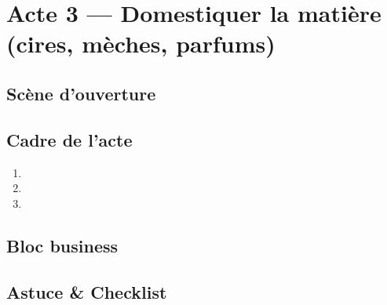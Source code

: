 \documentclass[../../main.tex]{subfiles}
\begin{document}
\chapter{Acte 3 — Domestiquer la matière (cires, mèches, parfums)}

\begin{Hook}
\end{Hook}

\section*{Scène d'ouverture}

\section{Cadre de l'acte}
\begin{BlocObjectif}
\end{BlocObjectif}

\spacer

\begin{BlocMateriel}
\end{BlocMateriel}

\spacer

\begin{BlocEtapes}
\begin{enumerate}
  \item 
  \item 
  \item 
\end{enumerate}
\end{BlocEtapes}

\spacer

\begin{BlocControles}
\end{BlocControles}

\spacer

\begin{BlocDepannage}
\end{BlocDepannage}

\section{Bloc business}
\begin{BlocCouts}
\end{BlocCouts}

\spacer

\begin{BlocAVendre}
\end{BlocAVendre}

\section*{Astuce \& Checklist}
\begin{BlocAstuce}
\end{BlocAstuce}

\spacer

\begin{BlocChecklist}
\end{BlocChecklist}
\end{document}
